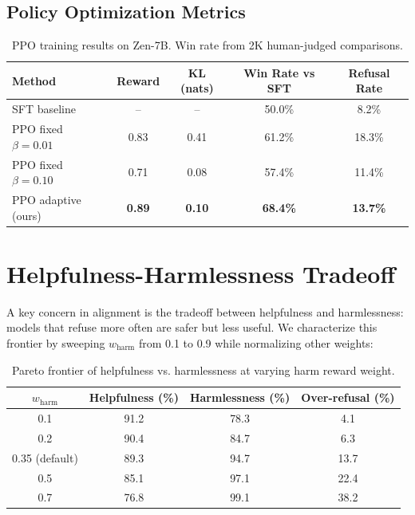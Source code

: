 \documentclass[11pt,a4paper]{article}
\begin{document}
\subsection{Policy Optimization Metrics}

\begin{table}[H]
\centering
\begin{tabular}{lcccc}
\toprule
\textbf{Method} & \textbf{Reward} & \textbf{KL (nats)} & \textbf{Win Rate vs SFT} & \textbf{Refusal Rate} \\
\midrule
SFT baseline & -- & -- & 50.0\% & 8.2\% \\
PPO fixed $\beta=0.01$ & 0.83 & 0.41 & 61.2\% & 18.3\% \\
PPO fixed $\beta=0.10$ & 0.71 & 0.08 & 57.4\% & 11.4\% \\
PPO adaptive (ours) & \textbf{0.89} & \textbf{0.10} & \textbf{68.4\%} & \textbf{13.7\%} \\
\bottomrule
\end{tabular}
\caption{PPO training results on Zen-7B. Win rate from 2K human-judged comparisons.}
\end{table}

\section{Helpfulness-Harmlessness Tradeoff}

A key concern in alignment is the tradeoff between helpfulness and harmlessness:
models that refuse more often are safer but less useful. We characterize this frontier
by sweeping $w_\text{harm}$ from 0.1 to 0.9 while normalizing other weights:

\begin{table}[H]
\centering
\begin{tabular}{cccc}
\toprule
\textbf{$w_\text{harm}$} & \textbf{Helpfulness (\%)} & \textbf{Harmlessness (\%)} & \textbf{Over-refusal (\%)} \\
\midrule
0.1 & 91.2 & 78.3 & 4.1 \\
0.2 & 90.4 & 84.7 & 6.3 \\
0.35 (default) & 89.3 & 94.7 & 13.7 \\
0.5 & 85.1 & 97.1 & 22.4 \\
0.7 & 76.8 & 99.1 & 38.2 \\
\bottomrule
\end{tabular}
\caption{Pareto frontier of helpfulness vs. harmlessness at varying harm reward weight.}
\end{table}
\end{document}

